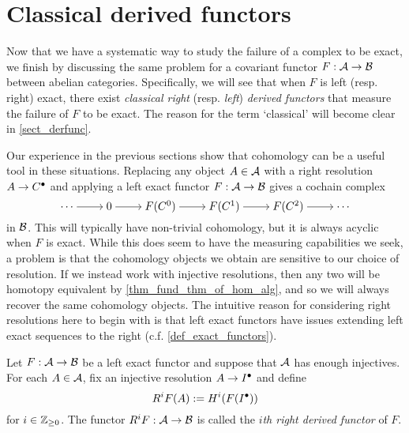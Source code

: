 \section{Classical derived functors}
\label{sect_classical_derfunc}

Now that we have a systematic way to study the failure of a complex
to be exact, we finish by discussing the same problem for a covariant
functor $F: \mathcal{A} \to \mathcal{B}$ between abelian categories.
Specifically, we will see that when $F$ is left (resp. right) exact,
there exist \emph{classical right} (resp. \emph{left}) \emph{derived
functors} that measure the failure of $F$ to be exact.
The reason for the term `classical' will become clear in \cref{sect_derfunc}.

Our experience in the previous sections show that cohomology can be a
useful tool in these situations.
Replacing any object $A \in \mathcal{A}$ with a right resolution $A \to
{{C}}^{\bullet}$ and applying a left exact functor $F: \mathcal{A} \to
\mathcal{B}$ gives a cochain complex
\[
  \begin{tikzcd}[cramped]
    \cdots & 0 & {F(C^0)} & {F(C^1)} & {F(C^2)} & \cdots
    \arrow[from=1-1, to=1-2]
    \arrow[from=1-2, to=1-3]
    \arrow[from=1-3, to=1-4]
    \arrow[from=1-4, to=1-5]
    \arrow[from=1-5, to=1-6]
  \end{tikzcd}
\]
in $\mathcal{B}$.
This will typically have non-trivial cohomology, but it is always
acyclic when $F$ is exact.
While this does seem to have the measuring capabilities we seek, a
problem is that the cohomology objects we obtain are sensitive to our
choice of resolution.
If we instead work with injective resolutions, then any two will be
homotopy equivalent by \cref{thm_fund_thm_of_hom_alg}, and so we will
always recover the same cohomology objects.
The intuitive reason for considering right resolutions here to begin
with is that left exact functors have issues extending left exact
sequences to the right (c.f. \cref{def_exact_functors}).

\begin{definition}
  Let $F: \mathcal{A} \to \mathcal{B}$ be a left exact functor and
  suppose that $\mathcal{A}$ has enough injectives.
  For each $A \in \mathcal{A}$, fix an injective resolution $A \to
  {{I}}^{\bullet}$ and define
  \[
    R^iF(A) := H^i(F({{I}}^{\bullet}))
  \]
  for $i \in \mathbb{Z}_{\geq 0}$.
  The functor $R^iF: \mathcal{A} \to \mathcal{B}$ is called the
  \emph{$i$th right derived functor} of $F$.
\end{definition}

